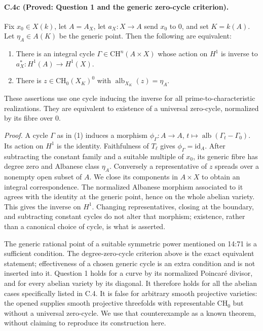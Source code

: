 \paragraph{C.4c (Proved: Question 1 and the generic zero-cycle criterion).}
Fix $x_0\in X(k)$, let $A=A_X$, let $a_X:X\to A$ send $x_0$ to $0$,
and set $K=k(A)$. Let $\eta_A\in A(K)$ be the generic point. Then the
following are equivalent:
\begin{enumerate}
\item There is an integral cycle $\Gamma\in\mathrm{CH}^{n}(A\times X)$
whose action on $H^1$ is inverse to $a_X^*:H^1(A)\to H^1(X)$.
\item There is $z\in\mathrm{CH}_0(X_K)^0$ with
$\operatorname{alb}_{X_K}(z)=\eta_A$.
\end{enumerate}
These assertions use one cycle inducing the inverse for all
prime-to-characteristic realizations. They are equivalent to existence
of a universal zero-cycle, normalized by its fibre over $0$.

\emph{Proof.}
A cycle $\Gamma$ as in (1) induces a morphism
$\phi_\Gamma:A\to A$, $t\mapsto
\operatorname{alb}(\Gamma_t-\Gamma_0)$. Its action on $H^1$ is the
identity. Faithfulness of $T_\ell$ gives $\phi_\Gamma=\mathrm{id}_A$.
After subtracting the constant family and a suitable multiple of
$x_0$, its generic fibre has degree zero and Albanese class $\eta_A$.
Conversely a representative of $z$ spreads over a nonempty open
subset of $A$. We close its components in $A\times X$ to obtain an
integral correspondence. The normalized Albanese morphism associated
to it agrees with the identity at the generic point, hence on the
whole abelian variety. This gives the inverse on $H^1$.
Changing representatives, closing at the boundary, and subtracting
constant cycles do not alter that morphism; existence, rather than a
canonical choice of cycle, is what is asserted.

The generic rational point of a suitable symmetric power mentioned
on 14:71 is a sufficient condition. The degree-zero-cycle criterion
above is the exact equivalent statement; effectiveness of a chosen
generic cycle is an extra condition and is not inserted into it.
Question 1 holds for a curve by its normalized Poincar\'e divisor,
and for every abelian variety by its diagonal. It therefore holds for
all the abelian cases specifically listed in C.4. It is false for
arbitrary smooth projective varieties: the opened
\citet[Theorem 1.4]{cyVoisin2025} supplies smooth projective threefolds
with representable $\mathrm{CH}_0$ but without a universal zero-cycle.
We use that counterexample as a known theorem, without claiming to
reproduce its construction here.

